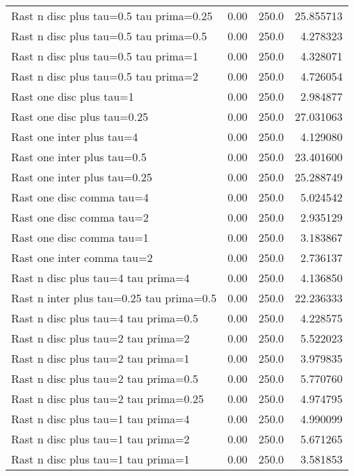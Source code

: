 \documentclass[11pt]{article}
\begin{document}
\begin{tabular}{lrrr}
Rast n disc  plus  tau=0.5 tau prima=0.25  &  0.00 &  250.0 &  25.855713 \\
Rast n disc  plus  tau=0.5 tau prima=0.5   &  0.00 &  250.0 &   4.278323 \\
Rast n disc  plus  tau=0.5 tau prima=1     &  0.00 &  250.0 &   4.328071 \\
Rast n disc  plus  tau=0.5 tau prima=2     &  0.00 &  250.0 &   4.726054 \\
Rast one disc  plus  tau=1                 &  0.00 &  250.0 &   2.984877 \\
Rast one disc  plus  tau=0.25              &  0.00 &  250.0 &  27.031063 \\
Rast one inter plus  tau=4                 &  0.00 &  250.0 &   4.129080 \\
Rast one inter plus  tau=0.5               &  0.00 &  250.0 &  23.401600 \\
Rast one inter plus  tau=0.25              &  0.00 &  250.0 &  25.288749 \\
Rast one disc  comma tau=4                 &  0.00 &  250.0 &   5.024542 \\
Rast one disc  comma tau=2                 &  0.00 &  250.0 &   2.935129 \\
Rast one disc  comma tau=1                 &  0.00 &  250.0 &   3.183867 \\
Rast one inter comma tau=2                 &  0.00 &  250.0 &   2.736137 \\
Rast n disc  plus  tau=4 tau prima=4       &  0.00 &  250.0 &   4.136850 \\
Rast n inter plus  tau=0.25 tau prima=0.5  &  0.00 &  250.0 &  22.236333 \\
Rast n disc  plus  tau=4 tau prima=0.5     &  0.00 &  250.0 &   4.228575 \\
Rast n disc  plus  tau=2 tau prima=2       &  0.00 &  250.0 &   5.522023 \\
Rast n disc  plus  tau=2 tau prima=1       &  0.00 &  250.0 &   3.979835 \\
Rast n disc  plus  tau=2 tau prima=0.5     &  0.00 &  250.0 &   5.770760 \\
Rast n disc  plus  tau=2 tau prima=0.25    &  0.00 &  250.0 &   4.974795 \\
Rast n disc  plus  tau=1 tau prima=4       &  0.00 &  250.0 &   4.990099 \\
Rast n disc  plus  tau=1 tau prima=2       &  0.00 &  250.0 &   5.671265 \\
Rast n disc  plus  tau=1 tau prima=1       &  0.00 &  250.0 &   3.581853 \\

\end{tabular}
\end{document}
